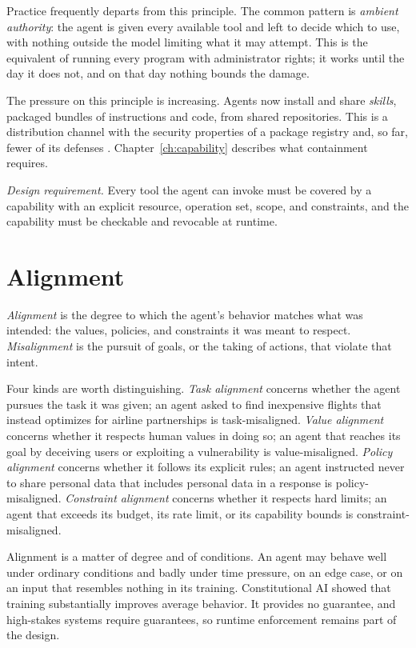 \documentclass[11pt]{book}
\begin{document}
Practice frequently departs from this principle. The common pattern is \textit{ambient authority}: the agent is given every available tool and left to decide which to use, with nothing outside the model limiting what it may attempt. This is the equivalent of running every program with administrator rights; it works until the day it does not, and on that day nothing bounds the damage.

The pressure on this principle is increasing. Agents now install and share \textit{skills}, packaged bundles of instructions and code, from shared repositories. This is a distribution channel with the security properties of a package registry and, so far, fewer of its defenses \cite{skillguard2026}. Chapter~\ref{ch:capability} describes what containment requires.

\textit{Design requirement.} Every tool the agent can invoke must be covered by a capability with an explicit resource, operation set, scope, and constraints, and the capability must be checkable and revocable at runtime.

\section{Alignment}

\emph{Alignment} is the degree to which the agent's behavior matches what was intended: the values, policies, and constraints it was meant to respect. \textit{Misalignment} is the pursuit of goals, or the taking of actions, that violate that intent.

Four kinds are worth distinguishing. \textit{Task alignment} concerns whether the agent pursues the task it was given; an agent asked to find inexpensive flights that instead optimizes for airline partnerships is task-misaligned. \textit{Value alignment} concerns whether it respects human values in doing so; an agent that reaches its goal by deceiving users or exploiting a vulnerability is value-misaligned. \textit{Policy alignment} concerns whether it follows its explicit rules; an agent instructed never to share personal data that includes personal data in a response is policy-misaligned. \textit{Constraint alignment} concerns whether it respects hard limits; an agent that exceeds its budget, its rate limit, or its capability bounds is constraint-misaligned.

Alignment is a matter of degree and of conditions. An agent may behave well under ordinary conditions and badly under time pressure, on an edge case, or on an input that resembles nothing in its training. Constitutional AI \cite{bai2022constitutional} showed that training substantially improves average behavior. It provides no guarantee, and high-stakes systems require guarantees, so runtime enforcement remains part of the design.
\end{document}
